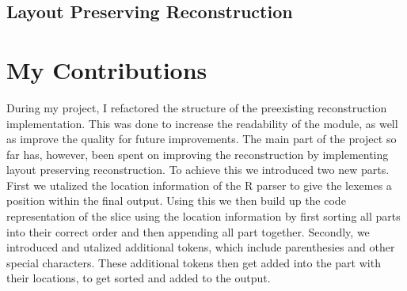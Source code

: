 \documentclass[a3paper, portrait, english, default]{uulm-cs-poster}
\begin{document}
\begin{multicols}{2}
\section*{Layout Preserving Reconstruction}
   \lipsum[4-6]
\end{multicols}
\section*{My Contributions}
\begin{multicols}{4}
	During my project, I refactored the structure of the preexisting reconstruction implementation. This was done to increase the readability of the module, as well as improve the quality for future improvements. The main part of the project so far has, however, been spent on improving the reconstruction by implementing layout preserving reconstruction.
	To achieve this we introduced two new parts. First we utalized the location information of the R parser to give the lexemes a position within the final output. Using this we then build up the code representation of the slice using the location information by first sorting all parts into their correct order and then appending all part together.
	Secondly, we introduced and utalized additional tokens, which include parenthesies and other special characters. These additional tokens then get added into the part with their locations, to get sorted and added to the output.
   \printbibliography
\end{multicols}
\end{document}
